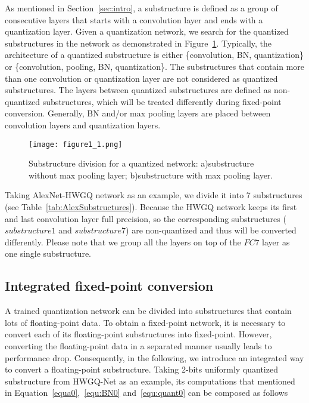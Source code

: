 \documentclass[10pt,twocolumn,letterpaper]{article}
\begin{document}
As mentioned in Section~\ref{sec:intro}, a substructure is defined as a group of consecutive layers that starts with a convolution layer and ends with a quantization layer. Given a quantization network, we search for the quantized substructures in the network as demonstrated in Figure~\ref{fig:substructure}. Typically, the architecture of a quantized substructure is either \{convolution, BN, quantization\} or \{convolution, pooling, BN, quantization\}. The substructures that contain more than one convolution or quantization layer are not considered as quantized substructures. The layers between quantized substructures are defined as non-quantized substructures, which will be treated differently during fixed-point conversion. Generally, BN and/or max pooling layers are placed between convolution layers and quantization layers.  



\begin{figure}[t]
\begin{center}
\texttt{[image: figure1\_1.png]}
\end{center}
\caption{Substructure division for a quantized network: a)substructure without max pooling layer; b)substructure with max pooling layer.}
\label{fig:substructure}
\end{figure}

Taking AlexNet-HWGQ network as an example, we divide it into 7 substructures (see Table~\ref{tab:AlexSubstructures}). Because the HWGQ network keeps its first and last convolution layer full precision, so the corresponding substructures ($substructure1$ and $substructure7$) are non-quantized and thus will be converted differently. Please note that we group all the layers on top of the $FC7$ layer as one single substructure.



\subsection{Integrated fixed-point conversion} \label{intefixconv}

A trained quantization network can be divided into substructures that contain lots of floating-point data. To obtain a fixed-point network, it is necessary to convert each of its floating-point substructures into fixed-point. However, converting the floating-point data in a separated manner usually leads to performance drop. Consequently, in the following, we introduce an integrated way to convert a floating-point substructure. Taking 2-bits uniformly quantized substructure from HWGQ-Net as an example, its computations that mentioned in Equation~\ref{equa0},~\ref{equ:BN0} and~\ref{equ:quant0} can be composed as follows
\end{document}
